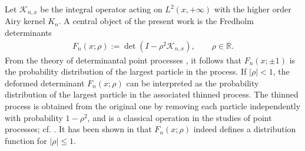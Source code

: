 \documentclass[11pt,a4paper]{article}
\numberwithin{equation}{section}
\begin{document}

Let $\mathcal{K}_{n,x}$ be the integral operator acting on $L^2(x,+\infty)$ with the higher order Airy kernel $K_n$. A central object of the present work is the Fredholm determinants
\begin{align}\label{Fred-Deter}
F_n(x;\rho):=\det(I-\rho^2 \mathcal{K}_{n,x}),\qquad \rho\in \mathbb{R}.
\end{align}
From the theory of determinantal point processes \cite{Joh06,Sos}, it follows that $F_n(x;\pm 1)$ is the probability distribution of the largest particle
in the process. If $|\rho|<1$, the deformed determinant $F_n(x;\rho)$ can be interpreted as the probability distribution of the largest particle in the associated thinned process. The thinned process is obtained from the original one by removing each particle independently with probability $1-\rho^2$, and is a classical operation in the studies of point processes; cf. \cite{BP06,Illbook}. It has been shown in \cite{CCG2021} that $F_n(x;\rho)$ indeed defines a distribution function for $|\rho|\leq 1$.
\end{document}
